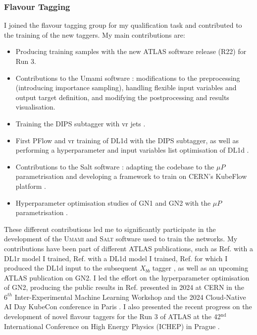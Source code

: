 \subsubsection{Flavour Tagging}
I joined the flavour tagging group for my qualification task and contributed to the training of the new taggers. My main contributions are:
\begin{itemize}
    \item Producing training samples with the new ATLAS software release (R22) for Run 3.
    \item Contributions to the Umami software \cite{UmamiCite}: modifications to the preprocessing (introducing importance sampling), handling flexible input variables and output target definition, and modifying the postprocessing and results visualisation.
    \item Training the DIPS subtagger with \gls{vr} jets \cite{ATL-PHYS-PUB-2020-014}.
    \item First PFlow and \gls{vr} training of DL1d with the DIPS subtagger, as well as performing a hyperparameter and input variables list optimisation of DL1d \cite{ATL-PLOT-FTAG-2023-01}.
    \item Contributions to the Salt software \cite{SaltCite}: adapting the codebase to the $\mu P$ parametrisation \cite{pmlr-v139-yang21c} and developing a framework to train on CERN's KubeFlow platform \cite{KubeFlowCern}. 
    \item Hyperparameter optimisation studies of GN1 and GN2 with the $\mu P$ parametrisation \cite{publicplotMUP}.
\end{itemize}
These different contributions led me to significantly participate in the development of the \textsc{Umami} \cite{UmamiCite} and \textsc{Salt} \cite{SaltCite} software used to train the networks. My contributions have been part of different ATLAS publications, such as Ref. \cite{ATL-PHYS-PUB-2022-027} with a DL1r model I trained, Ref. \cite{ATL-PLOT-FTAG-2023-01} with a DL1d model I trained, Ref. \cite{ATL-PHYS-PUB-2023-021} for which I produced the DL1d input to the subsequent $X_{bb}$ tagger \cite{ATL-PHYS-PUB-2020-019}, as well as an upcoming ATLAS publication on GN2. I led the effort on the hyperparameter optimisation of GN2, producing the public results in Ref. \cite{publicplotMUP} presented in 2024 at CERN in the $6^{th}$ Inter-Experimental Machine Learning Workshop \cite{publicplotMUP} and the 2024 Cloud-Native AI Day KubeCon conference in Paris \cite{KubeconTalk}. I also presented the recent progress on the development of novel flavour taggers for the Run 3 of ATLAS at the 42$^{\text{nd}}$ International Conference on High Energy Physics (ICHEP) in Prague \cite{Draguet:2906774}.

